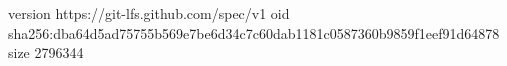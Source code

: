 version https://git-lfs.github.com/spec/v1
oid sha256:dba64d5ad75755b569e7be6d34c7c60dab1181c0587360b9859f1eef91d64878
size 2796344
